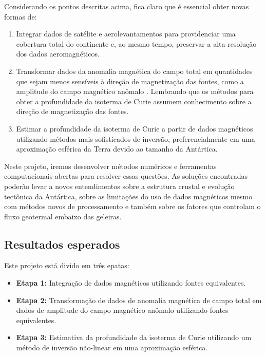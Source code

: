 \documentclass[12pt,a4paper,oneside]{book}
\begin{document}
Considerando os pontos descritas acima, fica claro que é essencial obter novas
formas de:

\begin{enumerate}
  \item Integrar dados de satélite e aerolevantamentos para providenciar uma
    cobertura total do continente e, ao mesmo tempo, preservar a alta resolução
    dos dados aeromagnéticos.
  \item Transformar dados da anomalia magnética do campo total em quantidades
    que sejam menos sensíveis à direção de magnetização das fontes, como a
    amplitude do campo magnético anômalo \citep{Melo2021}. Lembrando que os
    métodos para obter a profundidade da isoterma de Curie assumem conhecimento
    sobre a direção de magnetização das fontes.
  \item Estimar a profundidade da isoterma de Curie a partir de dados
    magnéticos utilizando métodos mais sofisticados de inversão,
    preferencialmente em uma aproximação esférica da Terra devido ao tamanho da
    Antártica.
\end{enumerate}

\noindent
Neste projeto, iremos desenvolver métodos numéricos e ferramentas
computacionais abertas para resolver essas questões.
As soluções encontradas poderão levar a novos entendimentos sobre a estrutura
crustal e evolução tectônica da Antártica, sobre as limitações do uso de dados
magnéticos mesmo com métodos novos de processamento e também sobre os fatores
que controlam o fluxo geotermal embaixo das geleiras.

\subsection{Resultados esperados}

Este projeto está divido em três epatas:

\begin{itemize}
  \item \textbf{Etapa 1:} Integração de dados magnéticos utilizando fontes
    equivalentes.
  \item \textbf{Etapa 2:} Transformação de dados de anomalia magnética de campo
    total em dados de amplitude do campo magnético anômalo utilizando fontes
    equivalentes.
  \item \textbf{Etapa 3:} Estimativa da profundidade da isoterma de Curie
    utilizando um método de inversão não-linear em uma aproximação esférica.
\end{itemize}
\end{document}
